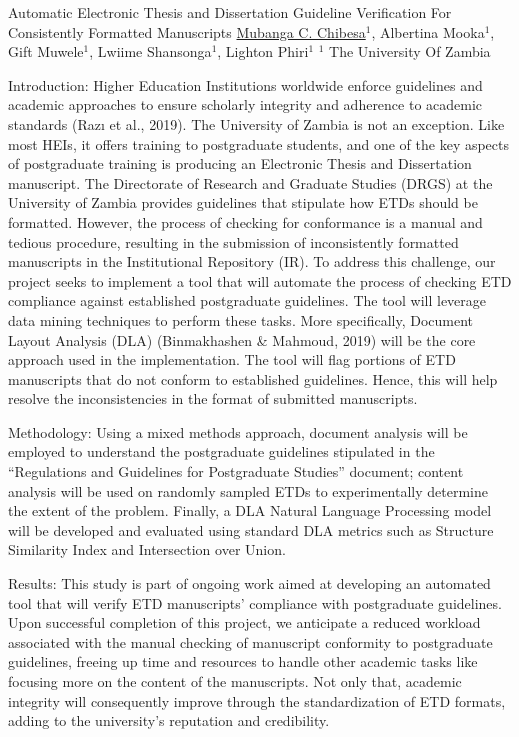 \begin{abstract_online}{Automatic Electronic Thesis and Dissertation Guideline Verification For Consistently Formatted Manuscripts}{%
    \underline{Mubanga C. Chibesa}$^{1}$, Albertina Mooka$^{1}$, Gift Muwele$^{1}$, Lwiime Shansonga$^{1}$, Lighton Phiri$^{1}$}{%
    }{%
    $^1$ The University Of Zambia}
    
Introduction: Higher Education Institutions worldwide enforce guidelines and academic approaches to ensure scholarly integrity and adherence to academic standards (Razı et al., 2019). The University of Zambia is not an exception. Like most HEIs, it offers training to postgraduate students, and one of the key aspects of postgraduate training is producing an Electronic Thesis and Dissertation manuscript. The Directorate of Research and Graduate Studies (DRGS) at the University of Zambia provides guidelines that stipulate how ETDs should be formatted. However, the process of checking for conformance is a manual and tedious procedure, resulting in the submission of inconsistently formatted manuscripts in the Institutional Repository (IR). To address this challenge, our project seeks to implement a tool that will automate the process of checking ETD compliance against established postgraduate guidelines. The tool will leverage data mining techniques to perform these tasks. More specifically, Document Layout Analysis (DLA) (Binmakhashen & Mahmoud, 2019) will be the core approach used in the implementation. The tool will flag portions of ETD manuscripts that do not conform to established guidelines. Hence, this will help resolve the inconsistencies in the format of submitted manuscripts.

Methodology: Using a mixed methods approach, document analysis will be employed to understand the postgraduate guidelines stipulated in the “Regulations and Guidelines for Postgraduate Studies” document; content analysis will be used on randomly sampled ETDs to experimentally determine the extent of the problem. Finally, a DLA Natural Language Processing model will be developed and evaluated using standard DLA metrics such as Structure Similarity Index and Intersection over Union.

Results: This study is part of ongoing work aimed at developing an automated tool that will verify ETD manuscripts' compliance with postgraduate guidelines. Upon successful completion of this project, we anticipate a reduced workload associated with the manual checking of manuscript conformity to postgraduate guidelines, freeing up time and resources to handle other academic tasks like focusing more on the content of the manuscripts. Not only that, academic integrity will consequently improve through the standardization of ETD formats, adding to the university’s reputation and credibility.


\end{abstract_online}
